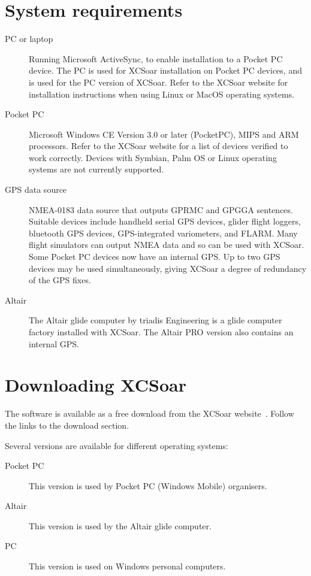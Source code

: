 \documentclass[a4paper,12pt]{refrep}
\begin{document}
\section{System requirements}
\begin{description}
\item[PC or laptop]
Running Microsoft ActiveSync, to enable installation to a Pocket PC
device.  The PC is used for XCSoar installation on Pocket PC devices,
and is used for the PC version of XCSoar.  Refer to the XCSoar website
for installation instructions when using Linux or MacOS operating
systems.
\item[Pocket PC]
Microsoft Windows CE Version 3.0 or later (PocketPC), MIPS and ARM
processors.  Refer to the XCSoar website for a list of devices verified
to work correctly.  Devices with Symbian, Palm OS or Linux operating
systems are not currently supported.
\item[GPS data source]
NMEA-0183 data source that outputs GPRMC and GPGGA sentences.
Suitable devices include handheld serial GPS devices, glider flight
loggers, bluetooth GPS devices, GPS-integrated variometers, and FLARM.
Many flight simulators can output NMEA data and so can be used with
XCSoar.  Some Pocket PC devices now have an internal GPS.
Up to two GPS devices may be used simultaneously, giving XCSoar 
a degree of redundancy of the GPS fixes. 
\item[Altair]
The Altair glide computer by triadis Engineering is a glide computer
factory installed with XCSoar.  The Altair PRO version also contains
an internal GPS.
\end{description}

\section{Downloading XCSoar}
The software is available as a free download from the XCSoar website~\xcsoarwebsite.  Follow the links to the download section.

Several versions are available for different operating systems:
\begin{description}
\item[Pocket PC] This version is used by Pocket PC (Windows Mobile) organisers.
\item[Altair] This version is used by the Altair glide computer.
\item[PC]  This version is used on Windows personal computers.
\end{description}
\end{document}
